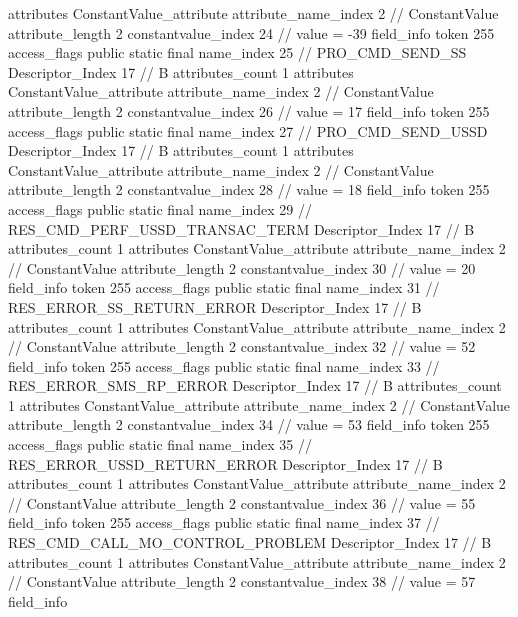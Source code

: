 {{{{{				attributes {
				ConstantValue_attribute {
					attribute_name_index	2		// ConstantValue
					attribute_length	2
					constantvalue_index	24		// value = -39
				}
				}
			}
			field_info {
				token	255
				access_flags	public static final
				name_index	25		// PRO_CMD_SEND_SS
				Descriptor_Index	17		// B
				attributes_count	1
				attributes {
				ConstantValue_attribute {
					attribute_name_index	2		// ConstantValue
					attribute_length	2
					constantvalue_index	26		// value = 17
				}
				}
			}
			field_info {
				token	255
				access_flags	public static final
				name_index	27		// PRO_CMD_SEND_USSD
				Descriptor_Index	17		// B
				attributes_count	1
				attributes {
				ConstantValue_attribute {
					attribute_name_index	2		// ConstantValue
					attribute_length	2
					constantvalue_index	28		// value = 18
				}
				}
			}
			field_info {
				token	255
				access_flags	public static final
				name_index	29		// RES_CMD_PERF_USSD_TRANSAC_TERM
				Descriptor_Index	17		// B
				attributes_count	1
				attributes {
				ConstantValue_attribute {
					attribute_name_index	2		// ConstantValue
					attribute_length	2
					constantvalue_index	30		// value = 20
				}
				}
			}
			field_info {
				token	255
				access_flags	public static final
				name_index	31		// RES_ERROR_SS_RETURN_ERROR
				Descriptor_Index	17		// B
				attributes_count	1
				attributes {
				ConstantValue_attribute {
					attribute_name_index	2		// ConstantValue
					attribute_length	2
					constantvalue_index	32		// value = 52
				}
				}
			}
			field_info {
				token	255
				access_flags	public static final
				name_index	33		// RES_ERROR_SMS_RP_ERROR
				Descriptor_Index	17		// B
				attributes_count	1
				attributes {
				ConstantValue_attribute {
					attribute_name_index	2		// ConstantValue
					attribute_length	2
					constantvalue_index	34		// value = 53
				}
				}
			}
			field_info {
				token	255
				access_flags	public static final
				name_index	35		// RES_ERROR_USSD_RETURN_ERROR
				Descriptor_Index	17		// B
				attributes_count	1
				attributes {
				ConstantValue_attribute {
					attribute_name_index	2		// ConstantValue
					attribute_length	2
					constantvalue_index	36		// value = 55
				}
				}
			}
			field_info {
				token	255
				access_flags	public static final
				name_index	37		// RES_CMD_CALL_MO_CONTROL_PROBLEM
				Descriptor_Index	17		// B
				attributes_count	1
				attributes {
				ConstantValue_attribute {
					attribute_name_index	2		// ConstantValue
					attribute_length	2
					constantvalue_index	38		// value = 57
				}
				}
			}
			field_info {
}}}}}
